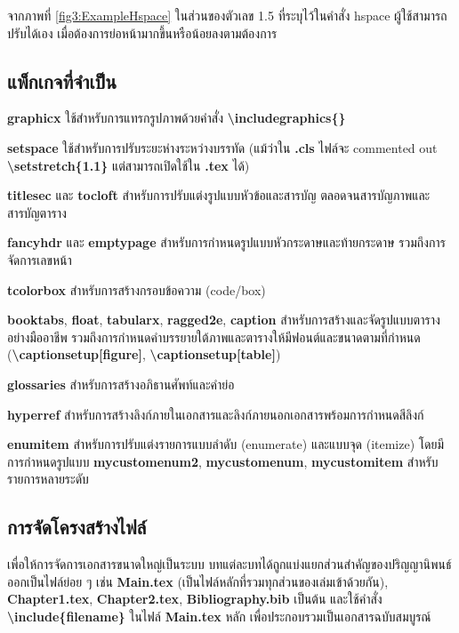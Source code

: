 \hspace*{1.5em} %
จากภาพที่ \ref{fig3:ExampleHspace} ในส่วนของตัวเลข 1.5 ที่ระบุไว้ในคำสั่ง hspace ผู้ใช้สามารถปรับได้เอง เมื่อต้องการย่อหน้ามากขึ้นหรือน้อยลงตามต้องการ

\subsection{แพ็กเกจที่จำเป็น}

\begin{mycustomitem2}
    \item \textbf{graphicx} ใช้สำหรับการแทรกรูปภาพด้วยคำสั่ง \textbf{\textbackslash includegraphics\{\}}
    \item \textbf{setspace} ใช้สำหรับการปรับระยะห่างระหว่างบรรทัด (แม้ว่าใน \textbf{.cls} ไฟล์จะ commented out \textbf{\textbackslash setstretch\{1.1\}} แต่สามารถเปิดใช้ใน \textbf{.tex} ได้)
    \item \textbf{titlesec} และ \textbf{tocloft} สำหรับการปรับแต่งรูปแบบหัวข้อและสารบัญ ตลอดจนสารบัญภาพและสารบัญตาราง
    \item \textbf{fancyhdr} และ \textbf{emptypage} สำหรับการกำหนดรูปแบบหัวกระดาษและท้ายกระดาษ รวมถึงการจัดการเลขหน้า
    \item \textbf{tcolorbox} สำหรับการสร้างกรอบข้อความ (code/box)
    \item \textbf{booktabs}, \textbf{float}, \textbf{tabularx}, \textbf{ragged2e}, \textbf{caption} สำหรับการสร้างและจัดรูปแบบตารางอย่างมืออาชีพ รวมถึงการกำหนดคำบรรยายใต้ภาพและตารางให้มีฟอนต์และขนาดตามที่กำหนด (\textbf{\textbackslash captionsetup[figure]}, \textbf{\textbackslash captionsetup[table]})
    \item \textbf{glossaries} สำหรับการสร้างอภิธานศัพท์และคำย่อ
    \item \textbf{hyperref} สำหรับการสร้างลิงก์ภายในเอกสารและลิงก์ภายนอกเอกสารพร้อมการกำหนดสีลิงก์
    \item \textbf{enumitem} สำหรับการปรับแต่งรายการแบบลำดับ (enumerate) และแบบจุด (itemize) โดยมีการกำหนดรูปแบบ \textbf{mycustomenum2}, \textbf{mycustomenum}, \textbf{mycustomitem} สำหรับรายการหลายระดับ
\end{mycustomitem2}

\subsection{การจัดโครงสร้างไฟล์}
\hspace*{1.5em} %
เพื่อให้การจัดการเอกสารขนาดใหญ่เป็นระบบ บทแต่ละบทได้ถูกแบ่งแยกส่วนสำคัญของปริญญานิพนธ์ออกเป็นไฟล์ย่อย ๆ เช่น \textbf{Main.tex} (เป็นไฟล์หลักที่รวมทุกส่วนของเล่มเข้าด้วยกัน), \textbf{Chapter1.tex}, \textbf{Chapter2.tex}, \textbf{Bibliography.bib} เป็นต้น และใช้คำสั่ง \textbf{\textbackslash include\{filename\}} ในไฟล์ \textbf{Main.tex} หลัก เพื่อประกอบรวมเป็นเอกสารฉบับสมบูรณ์


